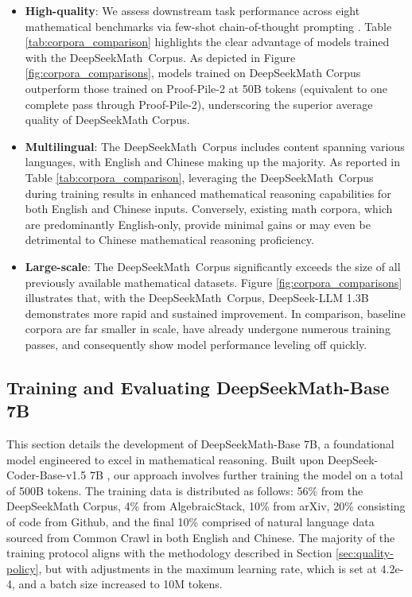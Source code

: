 \begin{itemize}[topsep=0pt]
    \item \textbf{High-quality}: 
    We assess downstream task performance across eight mathematical benchmarks via few-shot chain-of-thought prompting \cite{cot}. Table \ref{tab:corpora_comparison} highlights the clear advantage of models trained with the DeepSeekMath~Corpus. As depicted in Figure \ref{fig:corpora_comparisons}, models trained on DeepSeekMath Corpus outperform those trained on Proof-Pile-2 at 50B tokens (equivalent to one complete pass through Proof-Pile-2), underscoring the superior average quality of DeepSeekMath Corpus.
    \item \textbf{Multilingual}:
    The DeepSeekMath~Corpus includes content spanning various languages, with English and Chinese making up the majority. As reported in Table \ref{tab:corpora_comparison}, leveraging the DeepSeekMath~Corpus during training results in enhanced mathematical reasoning capabilities for both English and Chinese inputs. Conversely, existing math corpora, which are predominantly English-only, provide minimal gains or may even be detrimental to Chinese mathematical reasoning proficiency.
    \item \textbf{Large-scale}:
    The DeepSeekMath~Corpus significantly exceeds the size of all previously available mathematical datasets. Figure \ref{fig:corpora_comparisons} illustrates that, with the DeepSeekMath~Corpus, DeepSeek-LLM 1.3B demonstrates more rapid and sustained improvement. In comparison, baseline corpora are far smaller in scale, have already undergone numerous training passes, and consequently show model performance leveling off quickly.
\end{itemize}

\subsection{Training and Evaluating DeepSeekMath-Base 7B}

This section details the development of DeepSeekMath-Base 7B, a foundational model engineered to excel in mathematical reasoning. Built upon DeepSeek-Coder-Base-v1.5 7B \citep{deepseek-coder}, our approach involves further training the model on a total of 500B tokens. The training data is distributed as follows: 56\% from the DeepSeekMath Corpus, 4\% from AlgebraicStack, 10\% from arXiv, 20\% consisting of code from Github, and the final 10\% comprised of natural language data sourced from Common Crawl in both English and Chinese. The majority of the training protocol aligns with the methodology described in Section \ref{sec:quality-policy}, but with adjustments in the maximum learning rate, which is set at 4.2e-4, and a batch size increased to 10M tokens.

